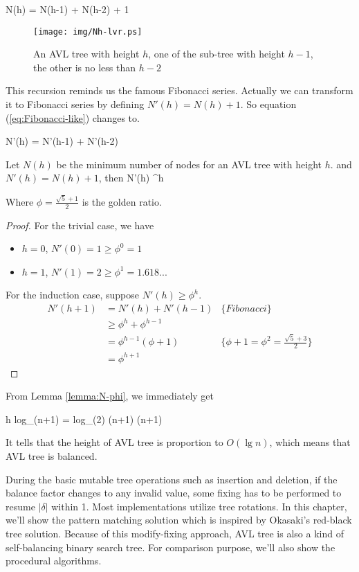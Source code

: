 \documentclass{article}
\begin{document}
\be
  N(h) = N(h-1) + N(h-2) + 1
  \label{eq:Fibonacci-like}
\ee

\begin{figure}[htbp]
   \centering
   \texttt{[image: img/Nh-lvr.ps]}
   \caption{An AVL tree with height $h$, one of the sub-tree with height $h-1$, the other is no less than $h-2$} \label{fig:N-h-relation}
\end{figure}

This recursion reminds us the famous Fibonacci series. Actually we can
transform it to Fibonacci series by defining $N'(h) = N(h)+1$. So equation
(\ref{eq:Fibonacci-like}) changes to.

\be
  N'(h) = N'(h-1) + N'(h-2)
\ee

\begin{lemma}
\label{lemma:N-phi}
Let $N(h)$ be the minimum number of nodes for an AVL tree with
height $h$. and $N'(h) = N(h) + 1$, then
\be
  N'(h) \geq \phi^h
\ee

Where $\phi = \frac{\sqrt{5}+1}{2}$ is the golden ratio.
\end{lemma}

\begin{proof}
For the trivial case, we have
\begin{itemize}
\item $h=0$, $N'(0) = 1 \geq \phi^0 = 1$
\item $h=1$, $N'(1) = 2 \geq \phi^1 = 1.618...$
\end{itemize}

For the induction case, suppose $N'(h) \geq \phi^h$.
\[
  \begin{array}{lll}
  N'(h+1) & = N'(h) + N'(h-1) & \{Fibonacci\} \\
          & \geq \phi^h + \phi^{h-1} & \\
          & = \phi^{h-1}(\phi + 1) & \{\phi + 1 = \phi^2 = \frac{\sqrt{5}+3}{2}\} \\
          & = \phi^{h+1}
 \end{array}
\]
\end{proof}

From Lemma \ref{lemma:N-phi}, we immediately get

\be
  h \leq log_{\phi}(n+1) = log_{\phi}(2) \cdot \lg (n+1)  \lg (n+1)
  \label{eq:AVL-height}
\ee

It tells that the height of AVL tree is proportion to $O(\lg n)$, which
means that AVL tree is balanced.

During the basic mutable tree operations such as insertion and deletion,
if the balance factor changes to any invalid value, some fixing has
to be performed to resume $|\delta|$ within 1. Most implementations utilize
tree rotations. In this chapter, we'll show the pattern matching solution
which is inspired by Okasaki's red-black tree solution\cite{okasaki}.
Because of this modify-fixing approach, AVL tree is also a kind of
self-balancing binary search tree. For comparison purpose, we'll also
show the procedural algorithms.
\end{document}
